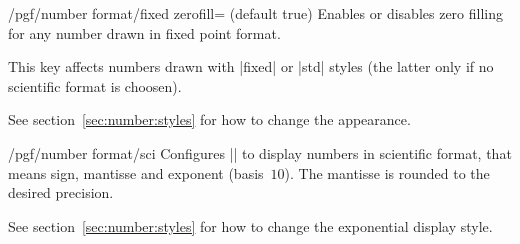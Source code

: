 \begin{key}{/pgf/number format/fixed zerofill=  (default true)}
Enables or disables zero filling for any number drawn in fixed point format.

\begin{codeexample}[]
\hspace{1em}
\hspace{1em}
\hspace{1em}
\hspace{1em}
\end{codeexample}
This key affects numbers drawn with |fixed| or |std| styles (the latter only if no scientific format is choosen).
\begin{codeexample}[]
\hspace{1em}
\hspace{1em}
\hspace{1em}
\end{codeexample}

See section~\ref{sec:number:styles} for how to change the appearance.
\end{key}

\begin{key}{/pgf/number format/sci}
Configures |\pgfmathprintnumber| to display numbers in scientific format, that means sign, mantisse and exponent (basis~$10$). The mantisse is rounded to the desired precision.

\begin{codeexample}[]
\hspace{1em}
\hspace{1em}
\hspace{1em}
\hspace{1em}
\end{codeexample}

See section~\ref{sec:number:styles} for how to change the exponential display style.
\end{key}

